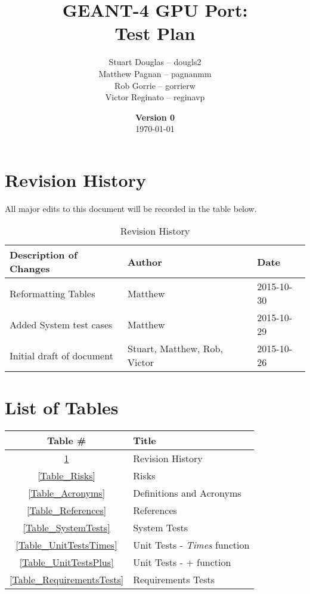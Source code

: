 \documentclass[12pt]{article}
\title{
\LARGE GEANT-4 GPU Port:
\\\vspace{10mm}
\large \textbf{Test Plan}
\vspace{40mm}
}
\author{
Stuart Douglas -- dougls2
\\Matthew Pagnan -- pagnanmm
\\Rob Gorrie -- gorrierw
\\Victor Reginato -- reginavp
\vspace{10mm}
}
\date{\vfill \textbf{Version 0}\\ \today}
\begin{document}

\maketitle
\newpage

\tableofcontents
\newpage
{}
\restoregeometry


\section*{Revision History}
All major edits to this document will be recorded in the table below.

\begin{table}[h]
\centering
\caption{Revision History}\label{Table_Revision}
\begin{tabular}{lll}
\toprule
\bf Description of Changes & \bf Author & \bf Date\\\midrule
Reformatting Tables & Matthew & 2015-10-30\\
Added System test cases & Matthew & 2015-10-29\\
Initial draft of document & Stuart, Matthew, Rob, Victor & 2015-10-26\\
\bottomrule
\end{tabular}
\end{table}

\section*{List of Tables}

\begin{center}
\begin{tabular}{cl}
\toprule
\bf Table \# & \bf Title\\\midrule
\ref{Table_Revision} & Revision History\\
\ref{Table_Risks} & Risks\\
\ref{Table_Acronyms} & Definitions and Acronyms\\
\ref{Table_References} & References\\
\ref{Table_SystemTests} & System Tests\\
\ref{Table_UnitTestsTimes} & Unit Tests - \emph{Times} function\\
\ref{Table_UnitTestsPlus} & Unit Tests - $+$ function\\
\ref{Table_RequirementsTests} & Requirements Tests\\
\bottomrule
\end{tabular}
\end{center}
\end{document}
